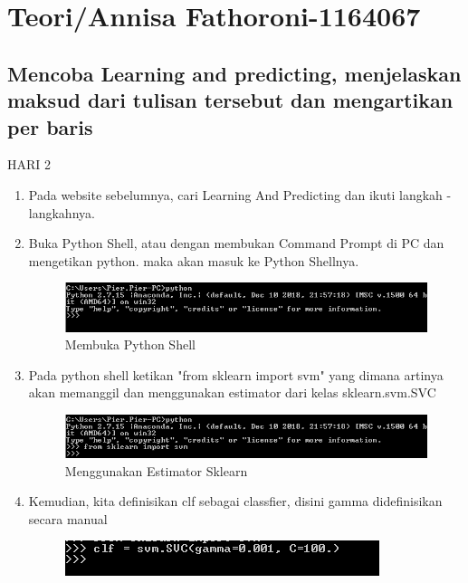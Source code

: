 \section{Teori/Annisa Fathoroni-1164067}
\subsection{Mencoba Learning and predicting, menjelaskan maksud dari tulisan tersebut dan mengartikan per baris}
HARI 2

\begin{enumerate}
\item
Pada website sebelumnya, cari Learning And Predicting dan ikuti langkah -langkahnya.
\item
Buka Python Shell, atau dengan membukan Command Prompt di PC dan mengetikan python. maka akan masuk ke Python Shellnya.
\begin{figure}
	\begin{center}
   	 \includegraphics[scale=1]{figures/tasya1.png}
   	 \caption{Membuka Python Shell}	
	\end{center}
\end{figure}
\item
Pada python shell ketikan "from sklearn import svm" yang dimana artinya akan memanggil dan menggunakan estimator dari kelas sklearn.svm.SVC
\begin{figure}
	\begin{center}
   	 \includegraphics[scale=1]{figures/tasya2.png}
   	 \caption{Menggunakan Estimator Sklearn }	
	\end{center}
\end{figure}
\item
Kemudian, kita definisikan clf sebagai classfier, disini gamma didefinisikan secara manual
\begin{figure}
	\begin{center}
   	 \includegraphics[scale=1]{figures/tasya3.png}

\end{center}
\end{figure}
\end{enumerate}
